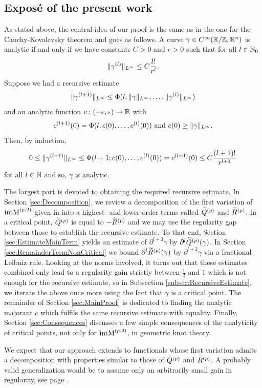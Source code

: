 \subsection*{Exposé of the present work}
As stated above, the central idea of our proof is the same as in the one for the Cauchy-Kovalevsky theorem and goes as follows.
A curve $\gamma \in C^\infty(\mathbb{R}/\mathbb{Z},\mathbb{R}^n)$ is analytic if and only if we have constants $C>0$ and $r>0$ such that for all $l \in \mathbb{N}_0$
\[
	 \norm[L^\infty]{\gamma^{(l)}} \le C \frac {l!} {r^l}.
\]
Suppose we had a recursive estimate
\[
	\norm[L^\infty]{\gamma^{(l+1)}} \le \Phi(l;\norm[L^\infty]{\gamma},\ldots,\norm[L^\infty]{\gamma^{(l)}})
\]
and an analytic function $c:(-\varepsilon, \varepsilon) \to \mathbb{R}$ with
\[
	c^{(l+1)}(0) = \Phi(l;c(0),\ldots,c^{(l)}(0)) \text{ and } c(0) \ge \norm[L^\infty]{\gamma}.
\]
Then, by induction,
\[
	\begin{split}
		0 \le \norm[L^\infty]{\gamma^{(l+1)}} \le \Phi(l+1;c(0),\ldots,c^{(l)}(0)) = c^{(l+1)}(0) \le C \frac {(l+1)!} {r^{l+1}}
	\end{split}
\]
for all $l \in \mathbb{N}$ and so, $\gamma$ is analytic.

The largest part is devoted to obtaining the required recursive estimate.
In Section \ref{sec:Decomposition}, we review a decomposition of the first variation of $\operatorname{intM}^{\left(p,2\right)}$ given in \cite[Section~4]{BlattReiter:2015:Menger} into a highest- and lower-order terms called $\widetilde Q^{(p)}$ and $\widetilde R^{(p)}$.
In a critical point, $\widetilde Q^{(p)}$ is equal to $-\widetilde R^{(p)}$ and we may use the regularity gap between those to establish the recursive estimate.
To that end, Section \ref{sec:EstimateMainTerm} yields an estimate of $\partial^{l+3} \gamma$ by $\partial^l\widetilde Q^{(p)}(\gamma)$.
In Section \ref{sec:RemainderTermNonCritical} we bound $\partial^l \widetilde R^{(p)}(\gamma)$ by $\partial^{l+2} \gamma$ via a fractional Leibniz rule.
Looking at the norms involved, it turns out that these estimates combined only lead to a regularity gain strictly between $\frac 1 2$ and $1$ which is not enough for the recursive estimate, so in Subsection \ref{subsec:RecursiveEstimate}, we iterate the above once more using the fact that $\gamma$ is a critical point.
The remainder of Section \ref{sec:MainProof} is dedicated to finding the analytic majorant $c$ which fulfils the same recursive estimate with equality.
Finally, Section \ref{sec:Consequences} discusses a few simple consequences of the analyticity of critical points, not only for $\operatorname{intM}^{\left(p,2\right)}$, in geometric knot theory.

We expect that our approach extends to functionals whose first variation admits a decomposition with properties similar to those of $\widetilde Q^{(p)}$ and $\widetilde R^{(p)}$.
A probably valid generalization would be to assume only an arbitrarily small gain in regularity, see page \pageref{rem:smallerRegularityGain}.



